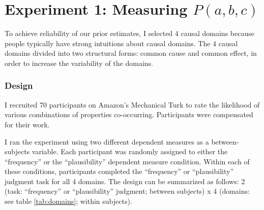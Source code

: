 \documentclass{llncs} %
\begin{document}
\section{Experiment 1: Measuring $P(a, b, c)$}
\label{prelicit}

To achieve reliability of our prior estimates, I selected 4 causal domains because people typically have strong intuitions about causal domains. The 4 causal domains divided into two structural forms: common cause and common effect, in order to increase the variability of the domains. 

\subsubsection{Design}

I recruited 70 participants on Amazon's Mechanical Turk to rate the likelihood of various combinations of properties co-occurring. Participants were compensated for their work.

I ran the experiment using two different dependent measures as a between-subjects variable. Each participant was randomly assigned to either the ``frequency'' or the ``plausibility'' dependent measure condition. Within each of these conditions, participants completed the ``frequency'' or ``plausibility'' judgment task for all 4 domains. The design can be summarized as follows: 2 (task: ``frequency'' or ``plausibility'' judgment; between subjects) x 4 (domains: see table \ref{tab:domains}; within subjects).
\end{document}
